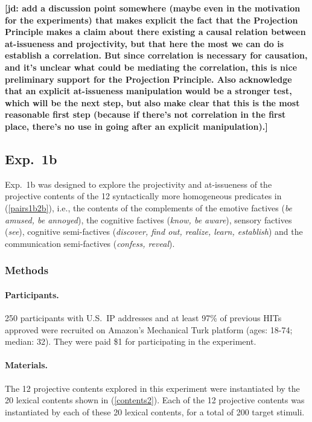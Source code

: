 \documentclass[11pt,fleqn]{article}
\newcommand{\6}{\mbox{$[\hspace*{-.6mm}[$}}
\newcommand{\9}{\mbox{$]\hspace*{-.6mm}]$}}
\newcommand{\jd}[1]{\textbf{\color{Green}[jd: #1]}}
\begin{document}
\jd{add a discussion point somewhere (maybe even in the motivation for the experiments) that makes explicit the fact that the Projection Principle makes a claim about there existing a causal relation between at-issueness and projectivity, but that here the most we can do is establish a correlation. But since correlation is necessary for causation, and it's unclear what could be mediating the correlation, this is nice preliminary support for the Projection Principle. Also acknowledge that an explicit at-issueness manipulation would be a stronger test, which will be the next step, but also make clear that this is the most reasonable first step (because if there's not correlation in the first place, there's no use in going after an explicit manipulation).}

\subsection{Exp.~1b}\label{s-exp1b} 

Exp.~1b was designed to explore the projectivity and at-issueness of the projective contents of the 12 syntactically more homogeneous predicates in (\ref{pairs1b2b}), i.e., the contents of the complements of the emotive factives ({\em be amused, be annoyed}), the cognitive factives ({\em know, be aware}), sensory factives ({\em see}), cognitive semi-factives ({\em discover, find out, realize, learn, establish}) and the communication semi-factives ({\em confess, reveal}).


\subsubsection{Methods}

\paragraph{Participants.} 250 participants with U.S.\ IP addresses and at least 97\% of previous HITs approved were recruited on Amazon's Mechanical Turk platform (ages: 18-74; median: 32). They were paid \$1 for participating in the experiment.

\paragraph{Materials.} The 12 projective contents explored in this experiment were instantiated by the 20 lexical contents shown in (\ref{contents2}). Each of the 12 projective contents was instantiated by each of these 20 lexical contents, for a total of 200 target stimuli. 
\end{document}
